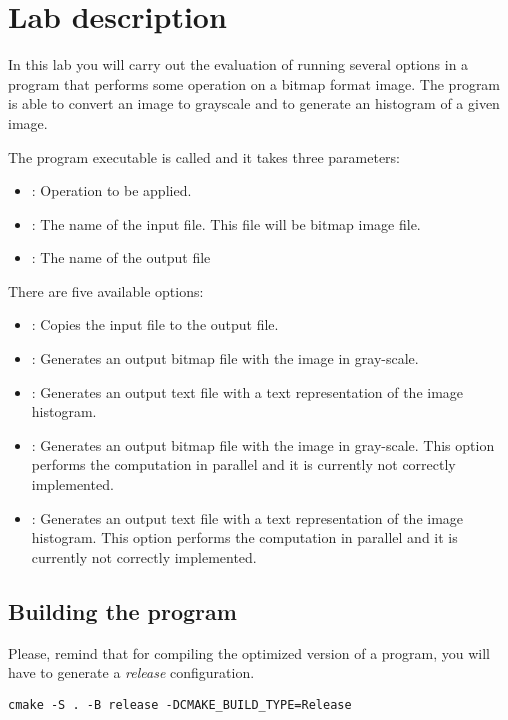 \section{Lab description}

In this lab you will carry out the evaluation of running several
options in a program that performs some operation on a bitmap format image.
The program is able to convert an image to grayscale and to generate an
histogram of a given image.

The program executable is called  and it takes three parameters:
\begin{itemize}
\item {}: Operation to be applied.
\item {}: The name of the input file. This file will be bitmap image file.
\item {}: The name of the output file
\end{itemize}

There are five available options:

\begin{itemize}
\item {}: Copies the input file to the output file.
\item {}: Generates an output bitmap file with the image in gray-scale.
\item {}: Generates an output text file with a text representation of the image histogram.
\item {}: Generates an output bitmap file with the image in gray-scale.
This option performs the computation in parallel and it is currently not correctly implemented.
\item {}: Generates an output text file with a text representation of the image histogram.
This option performs the computation in parallel and it is currently not correctly implemented.
\end{itemize}

\subsection{Building the program}

Please, remind that for compiling the optimized version of a program, 
you will have to generate a \emph{release} configuration.

\begin{lstlisting}[style=terminal,aboveskip=1em,belowskip=1em]
cmake -S . -B release -DCMAKE_BUILD_TYPE=Release
\end{lstlisting}

